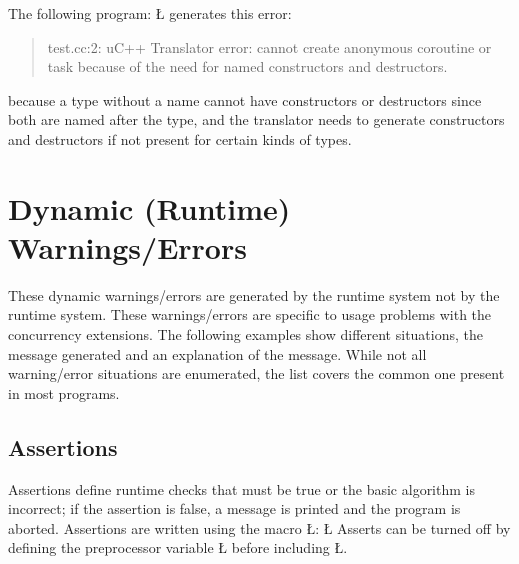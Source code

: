 \documentclass[openright,twoside]{report}
\begin{document}
The following program:
\LGinlinefalse\LGbegin\lgrinde
\L{}
\endlgrinde\LGend
generates this error:
\begin{quote}
\BGfont
test.cc:2: uC++ Translator error: cannot create anonymous coroutine or task because of the need for named constructors and destructors.
\end{quote}
because a type without a name cannot have constructors or destructors since both are named after the type, and the \uC translator needs to generate constructors and destructors if not present for certain kinds of types.


\section{Dynamic (Runtime) Warnings/Errors}

These dynamic warnings/errors are generated by the \uC runtime system not by the \CC runtime system.
These warnings/errors are specific to usage problems with the \uC concurrency extensions.
The following examples show different situations, the message generated and an explanation of the message.
While not all warning/error situations are enumerated, the list covers the common one present in most \uC programs.


\subsection{Assertions}
\label{s:Assertions}

Assertions define runtime checks that must be true or the basic algorithm is incorrect;
if the assertion is false, a message is printed and the program is aborted.
Assertions are written using the macro \LGinlinetrue\LGbegin\lgrinde\L{}\endlgrinde\LGend{}:
\LGinlinefalse\LGbegin\lgrinde
\L{}
\endlgrinde\LGend
Asserts can be turned off by defining the preprocessor variable \LGinlinetrue\LGbegin\lgrinde\L{}\endlgrinde\LGend{} before including \LGinlinetrue\LGbegin\lgrinde\L{}\endlgrinde\LGend{}.
\end{document}
